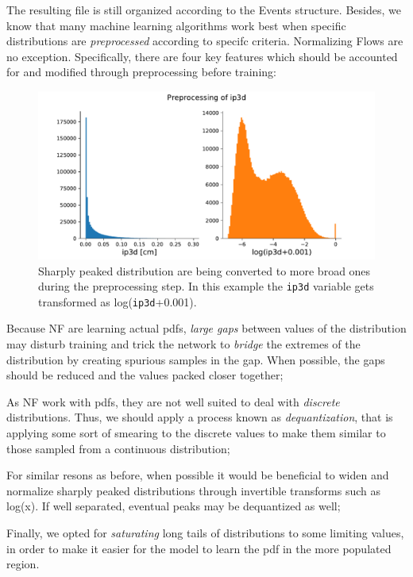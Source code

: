 The resulting file is still organized according to the Events structure. Besides, we know that many machine learning algorithms work best when specific distributions are \emph{preprocessed} according to specifc criteria. Normalizing Flows are no exception. Specifically, there are four key features which should be accounted for and modified through preprocessing before training:

\begin{figure}
    \centering
    \includegraphics[width=\columnwidth]{gfx/ch5/preproce.pdf}
    \caption[Preprocessing]{Sharply peaked distribution are being converted to more broad ones during the preprocessing step. In this example the \texttt{ip3d} variable gets transformed as log(\texttt{ip3d}+0.001).}
    \label{fig:preproce}
\end{figure}

\begin{outline}
\1 Because NF are learning actual pdfs, \emph{large gaps} between values of the distribution may disturb training and trick the network to \emph{bridge} the extremes of the distribution by creating spurious samples in the gap. When possible, the gaps should be reduced and the values packed closer together;

\1 As NF work with pdfs, they are not well suited to deal with \emph{discrete} distributions. Thus, we should apply a process known as \emph{dequantization}, that is applying some sort of smearing to the discrete values to make them similar to those sampled from a continuous distribution;

\1 For similar resons as before, when possible it would be beneficial to widen and normalize sharply peaked distributions through invertible transforms such as log(x). If well separated, eventual peaks may be dequantized as well;

\1 Finally, we opted for \emph{saturating} long tails of distributions to some limiting values, in order to make it easier for the model to learn the pdf in the more populated region.
\end{outline}

